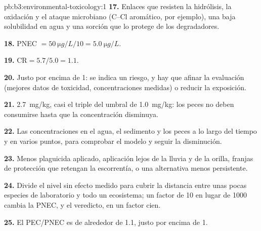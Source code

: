 \begin{solution}{pb:b3:environmental-toxicology:1}
\textbf{17.} Enlaces que resisten la hidrólisis, la oxidación y el ataque microbiano (C--Cl
aromático, por ejemplo), una baja solubilidad en agua y una sorción que lo protege de los
degradadores.

\textbf{18.} PNEC $= \qty{50}{\micro g/L}/10 = \qty{5.0}{\micro g/L}$.

\textbf{19.} $\mathrm{CR} = 5.7/5.0 = 1.1$.

\textbf{20.} Justo por encima de 1: se indica un riesgo, y hay que afinar la evaluación (mejores
datos de toxicidad, concentraciones medidas) o reducir la exposición.

\textbf{21.} \qty{2.7}{mg/kg}, casi el triple del umbral de \qty{1.0}{mg/kg}: los peces no deben consumirse
hasta que la concentración disminuya.

\textbf{22.} Las concentraciones en el agua, el sedimento y los peces a lo largo del tiempo y en varios puntos,
para comprobar el modelo y seguir la disminución.

\textbf{23.} Menos plaguicida aplicado, aplicación lejos de la lluvia y de la orilla,
franjas de protección que retengan la escorrentía, o una alternativa menos persistente.

\textbf{24.} Divide el nivel sin efecto medido para cubrir la distancia entre unas pocas
especies de laboratorio y todo un ecosistema; un factor de 10 en lugar de 1000 cambia la
PNEC, y el veredicto, en un factor cien.

\textbf{25.} El  PEC/PNEC es de alrededor de 1.1, justo por encima de 1.
\end{solution}
